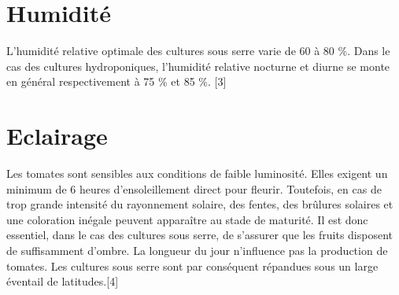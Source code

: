 \section{Humidité}
L'humidité relative optimale des cultures sous serre varie de 60 à 80 \%. Dans le cas des cultures hydroponiques, l'humidité relative nocturne et diurne se monte en général respectivement à 75 \% et 85 \%. [3] 
\section{Eclairage}
Les tomates sont sensibles aux conditions de faible luminosité. Elles exigent un minimum de 6 heures d'ensoleillement direct pour fleurir. Toutefois, en cas de trop grande intensité du rayonnement solaire, des fentes, des brûlures solaires et une coloration inégale peuvent apparaître au stade de maturité. Il est donc essentiel, dans le cas des cultures sous serre, de s'assurer que les fruits disposent de suffisamment d'ombre. La longueur du jour n'influence pas la production de tomates. Les cultures sous serre sont par conséquent répandues sous un large éventail de latitudes.[4]